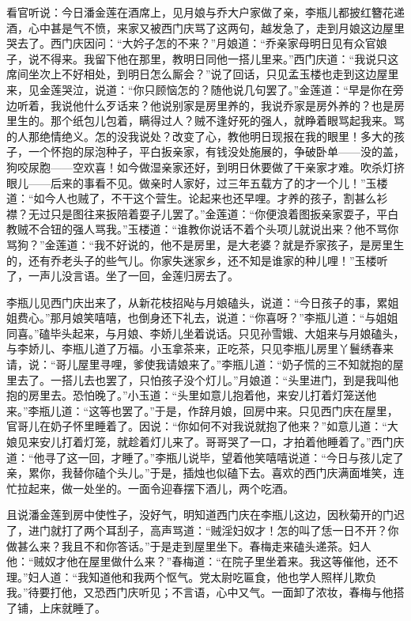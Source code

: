 看官听说：今日潘金莲在酒席上，见月娘与乔大户家做了亲，李瓶儿都披红簪花递酒，心中甚是气不愤，来家又被西门庆骂了这两句，越发急了，走到月娘这边屋里哭去了。西门庆因问：“大妗子怎的不来？”月娘道：“乔亲家母明日见有众官娘子，说不得来。我留下他在那里，教明日同他一搭儿里来。”西门庆道：“我说只这席间坐次上不好相处，到明日怎么厮会？”说了回话，只见孟玉楼也走到这边屋里来，见金莲哭泣，说道：“你只顾恼怎的？随他说几句罢了。”金莲道：“早是你在旁边听着，我说他什么歹话来？他说别家是房里养的，我说乔家是房外养的？也是房里生的。那个纸包儿包着，瞒得过人？贼不逢好死的强人，就睁着眼骂起我来。骂的人那绝情绝义。怎的没我说处？改变了心，教他明日现报在我的眼里！多大的孩子，一个怀抱的尿泡种子，平白扳亲家，有钱没处施展的，争破卧单——没的盖，狗咬尿胞——空欢喜！如今做湿亲家还好，到明日休要做了干亲家才难。吹杀灯挤眼儿——后来的事看不见。做亲时人家好，过三年五载方了的才一个儿！”玉楼道：“如今人也贼了，不干这个营生。论起来也还早哩。才养的孩子，割甚么衫襟？无过只是图往来扳陪着耍子儿罢了。”金莲道：“你便浪着图扳亲家耍子，平白教贼不合钮的强人骂我。”玉楼道：“谁教你说话不着个头项儿就说出来？他不骂你骂狗？”金莲道：“我不好说的，他不是房里，是大老婆？就是乔家孩子，是房里生的，还有乔老头子的些气儿。你家失迷家乡，还不知是谁家的种儿哩！”玉楼听了，一声儿没言语。坐了一回，金莲归房去了。

李瓶儿见西门庆出来了，从新花枝招飐与月娘磕头，说道：“今日孩子的事，累姐姐费心。”那月娘笑嘻嘻，也倒身还下礼去，说道：“你喜呀？”李瓶儿道：“与姐姐同喜。”磕毕头起来，与月娘、李娇儿坐着说话。只见孙雪娥、大姐来与月娘磕头，与李娇儿、李瓶儿道了万福。小玉拿茶来，正吃茶，只见李瓶儿房里丫鬟绣春来请，说：“哥儿屋里寻哩，爹使我请娘来了。”李瓶儿道：“奶子慌的三不知就抱的屋里去了。一搭儿去也罢了，只怕孩子没个灯儿。”月娘道：“头里进门，到是我叫他抱的房里去。恐怕晚了。”小玉道：“头里如意儿抱着他，来安儿打着灯笼送他来。”李瓶儿道：“这等也罢了。”于是，作辞月娘，回房中来。只见西门庆在屋里，官哥儿在奶子怀里睡着了。因说：“你如何不对我说就抱了他来？”如意儿道：“大娘见来安儿打着灯笼，就趁着灯儿来了。哥哥哭了一口，才拍着他睡着了。”西门庆道：“他寻了这一回，才睡了。”李瓶儿说毕，望着他笑嘻嘻说道：“今日与孩儿定了亲，累你，我替你磕个头儿。”于是，插烛也似磕下去。喜欢的西门庆满面堆笑，连忙拉起来，做一处坐的。一面令迎春摆下酒儿，两个吃酒。

且说潘金莲到房中使性子，没好气，明知道西门庆在李瓶儿这边，因秋菊开的门迟了，进门就打了两个耳刮子，高声骂道：“贼淫妇奴才！怎的叫了恁一日不开？你做甚么来？我且不和你答话。”于是走到屋里坐下。春梅走来磕头递茶。妇人他：“贼奴才他在屋里做什么来？”春梅道：“在院子里坐着来。我这等催他，还不理。”妇人道：“我知道他和我两个怄气。党太尉吃匾食，他也学人照样儿欺负我。”待要打他，又恐西门庆听见；不言语，心中又气。一面卸了浓妆，春梅与他搭了铺，上床就睡了。

